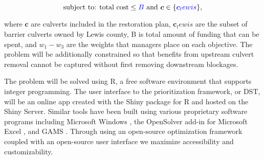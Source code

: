 \documentclass[12pt]{elsarticle}
\begin{document}
\begin{equation*}
\text{subject to:  total cost} \le \textcolor{blue}{B} \text{ and } \boldsymbol{c} \in \{\textcolor{blue}{\boldsymbol{c}_lewis}  \},
\end{equation*}

%

where $\boldsymbol{c}$ are culverts included in the restoration plan, $\boldsymbol{c}_lewis$ are the subset of barrier culverts owned by Lewis county, B is total amount of funding that can be spent, and $w_1-w_3$ are the weights that managers place on each objective. The problem will be additionally constrained so that benefits from upstream culvert removal cannot be captured without first removing downstream blockages.

The problem will be solved using R, a free software environment that supports integer programming. The user interface to the prioritization framework, or DST, will be an online app created with the Shiny package for R and hosted on the Shiny Server. Similar tools have been built using various proprietary software programs including Microsoft Windows \citep{optipass2015migratory}, the OpenSolver add-in for Microsoft Excel \citep{mcmanamay2019commonalities}, and GAMS \citep{moody2017pet}. Through using an open-source optimization framework coupled with an open-source user interface we maximize accessibility and customizability.  

\end{document}
